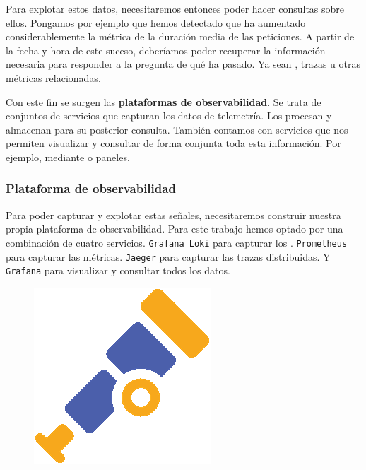 Para explotar estos datos, necesitaremos entonces poder hacer consultas sobre ellos. Pongamos por ejemplo que hemos detectado que ha aumentado considerablemente la métrica de la duración media de las peticiones. A partir de la fecha y hora de este suceso, deberíamos poder recuperar la información necesaria para responder a la pregunta de qué ha pasado. Ya sean , trazas u otras métricas relacionadas.

Con este fin se surgen las \textbf{plataformas de observabilidad}. Se trata de conjuntos de servicios que capturan los datos de telemetría. Los procesan y almacenan para su posterior consulta. \cite{zorrillacastroNETCoreApps2021} También contamos con servicios que nos permiten visualizar y consultar de forma conjunta toda esta información. Por ejemplo, mediante  o paneles.

\subsubsection{Plataforma de observabilidad}

Para poder capturar y explotar estas señales, necesitaremos construir nuestra propia plataforma de observabilidad. Para este trabajo hemos optado por una combinación de cuatro servicios. \texttt{Grafana Loki} para capturar los . \texttt{Prometheus} para capturar las métricas. \texttt{Jaeger} para capturar las trazas distribuidas. Y \texttt{Grafana} para visualizar y consultar todos los datos.

\begin{figure}
  \vspace{-10pt}
  \hspace{10pt}
  \centering
  \includegraphics[scale=0.5]{cap_despliegue/images/opentelemetry-logo}
\end{figure}

